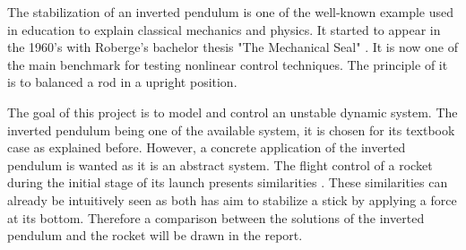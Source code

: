 %
%
%
%
%

The stabilization of an inverted pendulum is one of the well-known example used in education to explain classical mechanics and physics. It started to appear in the 1960's with Roberge's bachelor thesis "The Mechanical Seal" \citep{sci_article:InvertedPendulumHistory}. It is now one of the main benchmark for testing nonlinear control techniques. The principle of it is to balanced a rod in a upright position.

The goal of this project is to model and control an unstable dynamic system. The inverted pendulum being one of the available system, it is chosen for its textbook case as explained before. However, a concrete application of the inverted pendulum is wanted as it is an abstract system. The flight control of a rocket during the initial stage of its launch presents similarities \citep{sci_article:InvertedPendulumHistory}. These similarities can already be intuitively seen as both has aim to stabilize a stick by applying a force at its bottom. Therefore a comparison between the solutions of the inverted pendulum and the rocket will be drawn in the report.